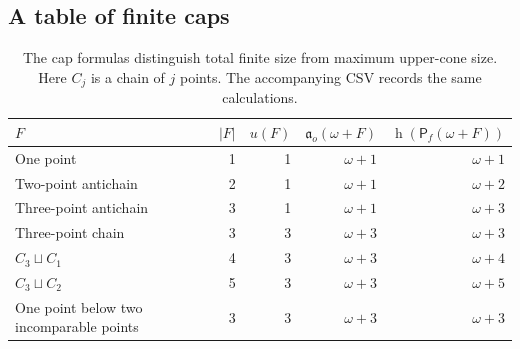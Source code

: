 \documentclass[11pt,letterpaper]{article}
\theoremstyle{teal}
\theoremstyle{definition}
\newcommand{\Pf}{\mathsf P_{\!f}}
\newcommand{\hgt}{\operatorname{h}}
\newcommand{\ao}{\mathfrak a_o}
\begin{document}
\subsection{A table of finite caps}
\begin{table}[htbp]
\centering
\renewcommand{\arraystretch}{1.2}
\begin{tabular}{@{}lrrrr@{}}
\toprule
$F$ & $|F|$ & $u(F)$ & $\ao(\omega+F)$ & $\hgt(\Pf(\omega+F))$\\
\midrule
One point & 1 & 1 & $\omega+1$ & $\omega+1$\\
Two-point antichain & 2 & 1 & $\omega+1$ & $\omega+2$\\
Three-point antichain & 3 & 1 & $\omega+1$ & $\omega+3$\\
Three-point chain & 3 & 3 & $\omega+3$ & $\omega+3$\\
$C_3\sqcup C_1$ & 4 & 3 & $\omega+3$ & $\omega+4$\\
$C_3\sqcup C_2$ & 5 & 3 & $\omega+3$ & $\omega+5$\\
One point below two incomparable points & 3 & 3 & $\omega+3$ & $\omega+3$\\
\bottomrule
\end{tabular}
\caption{The cap formulas distinguish total finite size from maximum upper-cone size. Here $C_j$ is a chain of $j$ points. The accompanying CSV records the same calculations.}
\label{tab:caps}
\end{table}
\end{document}
